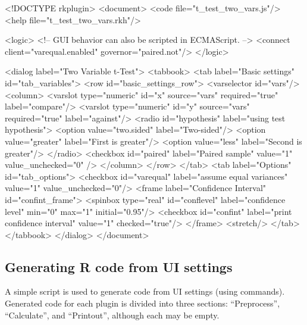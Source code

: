 \begin{footnotesize}
\begin{Code}
<!DOCTYPE rkplugin>
<document>
  <code file="t_test_two_vars.js"/>
  <help file="t_test_two_vars.rkh"/>

  <logic>
    <!-- GUI behavior can also be scripted in ECMAScript. -->
    <connect client="varequal.enabled" governor="paired.not"/>
  </logic>

  <dialog label="Two Variable t-Test">
    <tabbook>
      <tab label="Basic settings" id="tab_variables">
        <row id="basic_settings_row">
          <varselector id="vars"/>
          <column>
            <varslot type="numeric" id="x" source="vars" required="true"
              label="compare"/>                                                             
            <varslot type="numeric" id="y" source="vars" required="true"
              label="against"/>
            <radio id="hypothesis" label="using test hypothesis">
              <option value="two.sided" label="Two-sided"/>
              <option value="greater" label="First is greater"/>
              <option value="less" label="Second is greater"/>
            </radio>
            <checkbox id="paired" label="Paired sample" value="1" value_unchecked="0" />
          </column>
        </row>
      </tab>
      <tab label="Options" id="tab_options">
        <checkbox id="varequal" label="assume equal variances" value="1"
          value_unchecked="0"/>
        <frame label="Confidence Interval" id="confint_frame">
          <spinbox type="real" id="conflevel" label="confidence level" min="0" max="1"
            initial="0.95"/>
          <checkbox id="confint" label="print confidence interval" value="1"
            checked="true"/>
        </frame>
        <stretch/>
      </tab>
    </tabbook>
  </dialog>
</document>
\end{Code}
\end{footnotesize}

\subsection{Generating R code from UI settings}
\label{sec:generating_r_code_from_ui_settings}
A simple  script is used to generate  code from UI settings (using  commands).
Generated code for each plugin is divided into three sections: ``Preprocess'', ``Calculate'', and ``Printout'', although each
may be empty.

